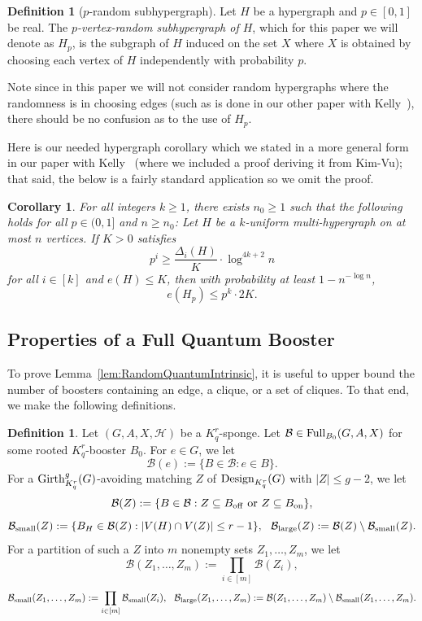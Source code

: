 \documentclass[11pt]{article}
\newcommand{\mc}[1]{\mathcal{#1}}
\newcounter{i}
\theoremstyle{plain}
\newtheorem{cor}[thm]{Corollary}
\theoremstyle{plain} %
\theoremstyle{definition}
\newtheorem{definition}[thm]{Definition}
\begin{document}
\begin{definition}[$p$-random subhypergraph]
Let $H$ be a hypergraph and $p\in [0,1]$ be real. The \emph{$p$-vertex-random subhypergraph of $H$}, which for this paper we will denote as $H_p$, is the subgraph of $H$ induced on the set $X$ where $X$ is obtained by choosing each vertex of $H$ independently with probability $p$.    
\end{definition}

Note since in this paper we will not consider random hypergraphs where the randomness is in choosing edges (such as is done in our other paper with Kelly~\cite{DKPIII}), there should be no confusion as to the use of $H_p$.

Here is our needed hypergraph corollary which we stated in a more general form in our paper with Kelly~\cite{DKPIII} (where we included a proof deriving it from Kim-Vu); that said, the below is a fairly standard application so we omit the proof.

\begin{cor}\label{cor:KimVu}
For all integers $k\ge 1$, there exists $n_0 \ge 1$ such that the following holds for all $p\in (0,1]$ and $n\ge n_0$: Let $H$ be a $k$-uniform multi-hypergraph on at most $n$ vertices. If $K>0$ satisfies
\begin{equation}
    p^{i}\ge \frac{\Delta_i(H)}{K}\cdot \log^{4k+2} n\tag{$*_i$}
\end{equation}
for all $i \in [k]$ and $e(H)\le K$, then with probability at least $1-n^{-\log n}$,
$$e(H_p)\le p^k \cdot 2K.$$
\end{cor}

\subsection{Properties of a Full Quantum Booster}

To prove Lemma~\ref{lem:RandomQuantumIntrinsic}, it is useful to upper bound the number of boosters containing an edge, a clique, or a set of cliques. To that end, we make the following definitions.

\begin{definition}
Let $(G,A,X,\mc{H})$ be a $K_q^r$-sponge. Let $\mc{B} \in {\rm Full}_{B_0}(G,A,X)$ for some rooted $K_q^r$-booster $B_0$. For $e\in G$, we let
$$\mc{B}(e) := \{B\in \mc{B}: e\in B\}.$$
For a ${\rm Girth}_{K_q^r}^g(G)$-avoiding matching $Z$ of ${\rm Design}_{K_q^r}(G)$ with $|Z|\le g-2$, we  let
$$\mc{B}(Z):= \{B\in \mc{B}: Z\subseteq B_{\rm off} \text{ or } Z\subseteq B_{\rm on}\},$$
$$\mc{B}_{\rm small}(Z):= \{B_H \in \mc{B}(Z): |V(H)\cap V(Z)|\le r-1\},~~\mc{B}_{\rm large}(Z):=\mc{B}(Z)\setminus \mc{B}_{\rm small}(Z).$$
For a partition of such a $Z$ into $m$ nonempty sets $Z_1,\ldots, Z_m$, we let
$$\mc{B}(Z_1,\ldots, Z_m):= \prod_{i\in [m]} \mc{B}(Z_i),$$
$$\mc{B}_{\rm small}(Z_1,\ldots,Z_m):= \prod_{i\in [m]} \mc{B}_{\rm small}(Z_i),~~\mc{B}_{\rm large}(Z_1,\ldots, Z_m):=\mc{B}(Z_1,\ldots,Z_m)\setminus \mc{B}_{\rm small}(Z_1,\ldots,Z_m).$$
\end{definition}
\end{document}
